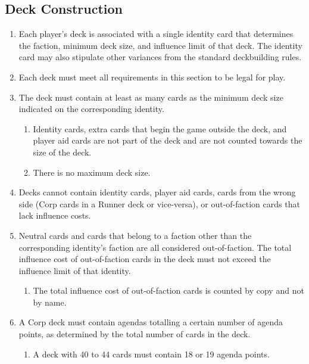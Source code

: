 \subsection{Deck Construction}
\begin{enumerate}
	\item Each player's deck is associated with a single identity card that determines the faction,	minimum deck size, and influence limit of that deck. The identity card may also stipulate other variances from the standard deckbuilding rules.
	\item Each deck must meet all requirements in this section to be legal for play.
	\item The deck must contain at least as many cards as the minimum deck size indicated on the corresponding identity.
	      \begin{enumerate}
		      \item Identity cards, extra cards that begin the game outside the deck, and player aid cards are not part of the deck and are not counted towards the size of the deck.
		      \item There is no maximum deck size.
	      \end{enumerate}
	\item Decks cannot contain identity cards, player aid cards, cards from the wrong side (Corp cards in a Runner deck or vice-versa), or out-of-faction cards that lack influence costs.
	\item Neutral cards and cards that belong to a faction other than the corresponding identity's faction are all considered out-of-faction. The total influence cost of out-of-faction cards in
	      the deck must not exceed the influence limit of that identity.
	      \begin{enumerate}
		      \item The total influence cost of out-of-faction cards is counted by copy and not by name.
	      \end{enumerate}
	\item A Corp deck must contain agendas totalling a certain number of agenda points, as determined by the total number of cards in the deck.
	      \begin{enumerate}
		      \item A deck with 40 to 44 cards must contain 18 or 19 agenda points.

\end{enumerate}
\end{enumerate}
